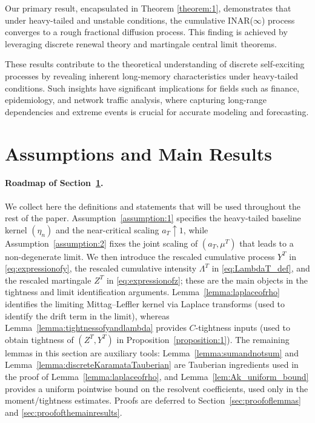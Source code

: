 \documentclass[letterpaper]{article}
\numberwithin{equation}{section}
\theoremstyle{definition}
\theoremstyle{remark}
\begin{document}
Our primary result, encapsulated in Theorem \ref{theorem:1}, demonstrates that under heavy-tailed and unstable conditions, the cumulative INAR($\infty$) process converges to a rough fractional diffusion process. This finding is achieved by leveraging discrete renewal theory and martingale central limit theorems.

These results contribute to the theoretical understanding of discrete self-exciting processes by revealing inherent long-memory characteristics under heavy-tailed conditions. Such insights have significant implications for fields such as finance, epidemiology, and network traffic analysis, where capturing long-range dependencies and extreme events is crucial for accurate modeling and forecasting.

\section{Assumptions and Main Results}
\label{sec:assumptionsandmainresults}
\paragraph{Roadmap of Section~\ref{sec:assumptionsandmainresults}.}
We collect here the definitions and statements that will be used throughout the rest of the paper.
Assumption~\ref{assumption:1} specifies the heavy-tailed baseline kernel $(\eta_n)$ and the near-critical scaling $a_T\uparrow 1$,
while Assumption~\ref{assumption:2} fixes the joint scaling of $(a_T,\mu^T)$ that leads to a non-degenerate limit.
We then introduce the rescaled cumulative process $Y^T$ in \eqref{eq:expressionofy}, the rescaled cumulative intensity $\Lambda^T$ in \eqref{eq:LambdaT_def},
and the rescaled martingale $Z^T$ in \eqref{eq:expressionofz}; these are the main objects in the tightness and limit identification arguments.
Lemma~\ref{lemma:laplaceofrho} identifies the limiting Mittag--Leffler kernel via Laplace transforms (used to identify the drift term in the limit),
whereas Lemma~\ref{lemma:tightnessofyandlambda} provides $C$-tightness inputs (used to obtain tightness of $(Z^T,Y^T)$ in Proposition~\ref{proposition:1}).
The remaining lemmas in this section are auxiliary tools: Lemma~\ref{lemma:sumandnotsum} and Lemma~\ref{lemma:discreteKaramataTauberian}
are Tauberian ingredients used in the proof of Lemma~\ref{lemma:laplaceofrho}, and Lemma~\ref{lem:Ak_uniform_bound} provides a uniform pointwise bound
on the resolvent coefficients, used only in the moment/tightness estimates.
Proofs are deferred to Section~\ref{sec:proofoflemmas} and \ref{sec:proofofthemainresults}.
\end{document}
